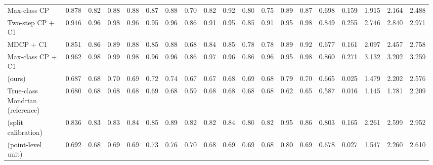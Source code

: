 \begin{table}[!htbp]
{\begin{tabular}{lcccccccccccccccccc}
Max-class CP & 0.878 & 0.82 & 0.88 & 0.88 & 0.87 & 0.88 & 0.70 & 0.82 & 0.92 & 0.80 & 0.75 & 0.89 & 0.87 & 0.698 & 0.159 & 1.915 & 2.164 & 2.488 \\
Two-step CP + C1 & 0.946 & 0.96 & 0.98 & 0.96 & 0.95 & 0.96 & 0.86 & 0.91 & 0.95 & 0.85 & 0.91 & 0.95 & 0.98 & 0.849 & 0.255 & 2.746 & 2.840 & 2.971 \\
MDCP + C1 & 0.851 & 0.86 & 0.89 & 0.88 & 0.85 & 0.88 & 0.68 & 0.84 & 0.85 & 0.78 & 0.78 & 0.89 & 0.92 & 0.677 & 0.161 & 2.097 & 2.457 & 2.758 \\
Max-class CP + C1 & 0.962 & 0.98 & 0.99 & 0.98 & 0.96 & 0.96 & 0.86 & 0.97 & 0.96 & 0.86 & 0.96 & 0.95 & 0.98 & 0.860 & 0.271 & 3.132 & 3.202 & 3.259 \\
\gamut{} (ours) & 0.687 & 0.68 & 0.70 & 0.69 & 0.72 & 0.74 & 0.67 & 0.67 & 0.68 & 0.69 & 0.68 & 0.79 & 0.70 & 0.665 & 0.025 & 1.479 & 2.202 & 2.576 \\
True-class Mondrian (reference) & 0.680 & 0.68 & 0.68 & 0.68 & 0.69 & 0.68 & 0.59 & 0.68 & 0.68 & 0.68 & 0.68 & 0.62 & 0.65 & 0.587 & 0.016 & 1.145 & 1.781 & 2.209 \\
\gamut{} (split calibration) & 0.836 & 0.83 & 0.83 & 0.84 & 0.85 & 0.89 & 0.82 & 0.82 & 0.84 & 0.80 & 0.82 & 0.95 & 0.86 & 0.803 & 0.165 & 2.261 & 2.599 & 2.952 \\
\gamut{} (point-level unit) & 0.692 & 0.68 & 0.69 & 0.69 & 0.73 & 0.76 & 0.70 & 0.68 & 0.69 & 0.69 & 0.68 & 0.80 & 0.69 & 0.678 & 0.027 & 1.547 & 2.260 & 2.610 \\
\bottomrule
\end{tabular}}
\end{table}

